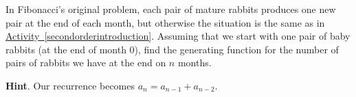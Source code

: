 \documentclass{book}
\begin{document}
\setcounter{cpjt}{261}
\addtocounter{cpjt}{-1}
\begin{activity}\label{originalFibonacci}
\hypertarget{p-1347}{}%
In Fibonacci's original problem, each pair of mature rabbits produces one new pair at the end of each month, but otherwise the situation is the same as in \hyperref[secondorderintroduction]{Activity~\ref{secondorderintroduction}}.  Assuming that we start with one pair of baby rabbits (at the end of month 0), find the generating function for the number of pairs of rabbits we have at the end on \(n\) months.%
\par\smallskip%
\noindent\textbf{Hint}.\hypertarget{hint-168}{}\quad%
\hypertarget{p-1348}{}%
Our recurrence becomes \(a_n = a_{n-1} + a_{n-2}\).%
\par\smallskip%
\noindent\end{activity}

\clearpage
\end{document}
